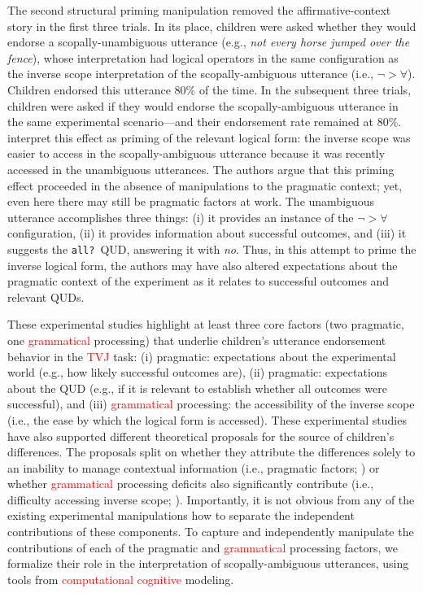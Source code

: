 \documentclass[preprint,authoryear]{elsarticle}\frenchspacing
\newcommand{\lp}[1]{\textcolor{red}{#1}} %
\begin{document}
The second structural priming manipulation removed the affirmative-context story in the first three trials. In its place, children were asked whether they would endorse a scopally-unambiguous utterance (e.g., \textit{not every horse jumped over the fence}), whose interpretation had logical operators in the same configuration as the inverse scope interpretation of the scopally-ambiguous utterance (i.e., $\neg>\forall$). Children endorsed this utterance 80\% of the time. In the subsequent three trials, children were asked if they would endorse the scopally-ambiguous utterance in the same experimental scenario---and their endorsement rate remained at 80\%. \cite{viauetal2010} interpret this effect as priming of the relevant logical form: the inverse scope was easier to access in the scopally-ambiguous utterance because it was recently accessed in the unambiguous utterances. The authors argue that this priming effect proceeded in the absence of manipulations to the pragmatic context; yet, even here there may still be pragmatic factors at work. The unambiguous utterance accomplishes three things: (i) it provides an instance of the $\neg>\forall$ configuration, (ii) it provides information about successful outcomes, and (iii) it suggests the \texttt{all?}~QUD, answering it with \emph{no}. Thus, in this attempt to prime the inverse logical form, the authors may have also altered expectations about the pragmatic context of the experiment as it relates to successful outcomes and relevant QUDs.

These experimental studies highlight at least three core factors (two pragmatic, one \lp{grammatical} processing) that underlie children's utterance endorsement behavior in the 
\lp{TVJ}
task: (i)  pragmatic: expectations about the experimental world (e.g., how likely successful outcomes are), (ii) pragmatic: expectations about the QUD (e.g., if it is relevant to establish whether all outcomes were successful), and (iii) \lp{grammatical} processing: the accessibility of the inverse scope (i.e., the ease by which the logical form is accessed). These experimental studies have also supported different theoretical proposals for the source of children's differences. The proposals split on whether they attribute the differences solely to an inability to manage contextual information (i.e., pragmatic factors; \citealp{gualmini2008rise}) or whether \lp{grammatical} processing deficits also significantly contribute (i.e., difficulty accessing inverse scope; \citealp{viauetal2010}). Importantly, it is not obvious from any of the existing experimental manipulations how to separate the independent contributions of these components. To capture and independently manipulate the contributions of each of the pragmatic and \lp{grammatical} processing factors, we formalize their role in the interpretation of scopally-ambiguous utterances, using tools from %
\lp{computational cognitive} modeling.
\end{document}
